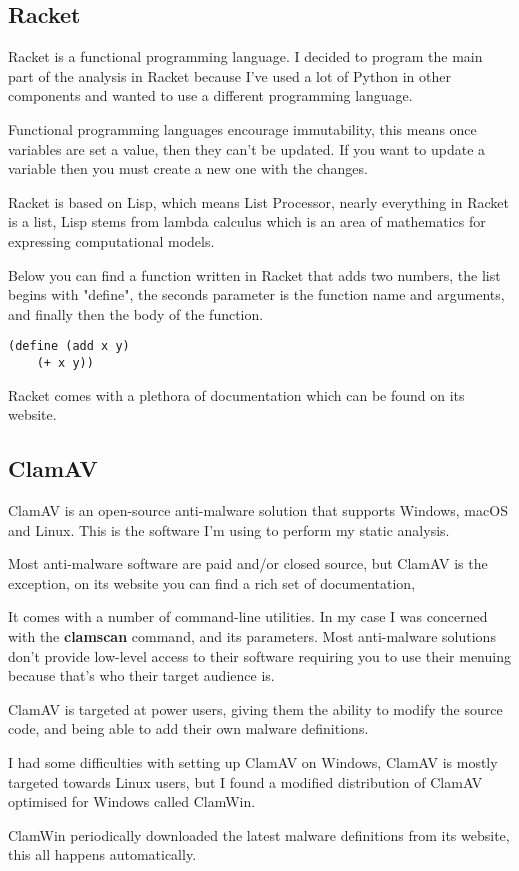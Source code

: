 \subsection{Racket}
Racket is a functional programming language. \cite{racket}
I decided to program the main part of the analysis in Racket
because I've used a lot of Python in other components and
wanted to use a different programming language.

Functional programming languages encourage immutability,
this means once variables are set a value, then they can't be updated.
If you want to update a variable then you must create a new one with
the changes.

Racket is based on Lisp, which means List Processor,
nearly everything in Racket is a list,
Lisp stems from lambda calculus which is an area
of mathematics for expressing computational models.

Below you can find a function written in Racket that adds two numbers,
the list begins with "define", the seconds parameter is the function name and arguments,
and finally then the body of the function.

\begin{lstlisting}
(define (add x y)
    (+ x y))
\end{lstlisting}

Racket comes with a plethora of documentation which can be found on its website.

\subsection{ClamAV}
ClamAV is an open-source anti-malware solution that
supports Windows, macOS and Linux. \cite{clamav}
This is the software I'm using to perform my static analysis.

Most anti-malware software are paid and/or closed source,
but ClamAV is the exception, on its website you can find a rich set of documentation,

It comes with a number of command-line utilities.
In my case I was concerned with the \textbf{clamscan} command, and its parameters.
Most anti-malware solutions don't provide low-level access to their software
requiring you to use their menuing because that's who their target audience is.

ClamAV is targeted at power users,
giving them the ability to modify the source code,
and being able to add their own malware definitions.

I had some difficulties with setting up ClamAV on Windows,
ClamAV is mostly targeted towards Linux users,
but I found a modified distribution of ClamAV optimised for Windows
called ClamWin.

ClamWin periodically downloaded the latest malware definitions from its website,
this all happens automatically.
